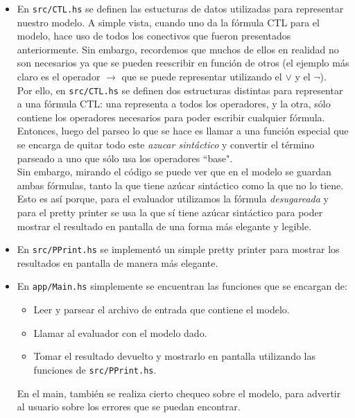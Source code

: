 \documentclass[11pt]{article}
\begin{document}
\begin{itemize}
  \item En \texttt{src/CTL.hs} se definen las estucturas de datos
        utilizadas para representar nuestro modelo. A simple vista, 
        cuando uno da la fórmula CTL para el modelo, hace uso de todos
        los conectivos que fueron presentados anteriormente. Sin embargo, 
        recordemos que muchos de ellos en realidad no son necesarios ya que
        se pueden reescribir en función de otros (el ejemplo más claro es 
        el operador $\rightarrow$ que se puede representar utilizando 
        el $\lor$ y el $\neg$).  \\
        
        Por ello, en \texttt{src/CTL.hs} se definen dos estructuras distintas 
        para representar a una fórmula CTL: una representa a todos los operadores, 
        y la otra, sólo contiene los operadores necesarios para poder escribir
        cualquier fórmula. Entonces, luego del parseo lo que se hace es llamar
        a una función especial que se encarga de quitar todo este \emph{azucar
        sintáctico} y convertir el término parseado a uno que sólo usa los 
        operadores ``base". \\

        Sin embargo, mirando el código se puede ver que en el modelo se guardan
        ambas fórmulas, tanto la que tiene azúcar sintáctico como la que no lo
        tiene. Esto es así porque, para el evaluador utilizamos la fórmula 
        \emph{desugareada} y para el pretty printer se usa la que sí tiene
        azúcar sintáctico para poder mostrar el resultado en pantalla de una forma más
        elegante y legible.
  \item En \texttt{src/PPrint.hs} se implementó un simple pretty printer
        para mostrar los resultados en pantalla de manera más elegante.
  \item En \texttt{app/Main.hs} simplemente se encuentran las funciones que
        se encargan de:
        \begin{itemize}
          \item Leer y parsear el archivo de entrada que contiene el modelo.
          \item Llamar al evaluador con el modelo dado.
          \item Tomar el resultado devuelto y mostrarlo en pantalla utilizando 
          las funciones de \texttt{src/PPrint.hs}.
        \end{itemize}
        En el main, también se realiza cierto chequeo sobre el modelo, para
        advertir al usuario sobre los errores que se puedan encontrar.
\end{itemize}
\end{document}
